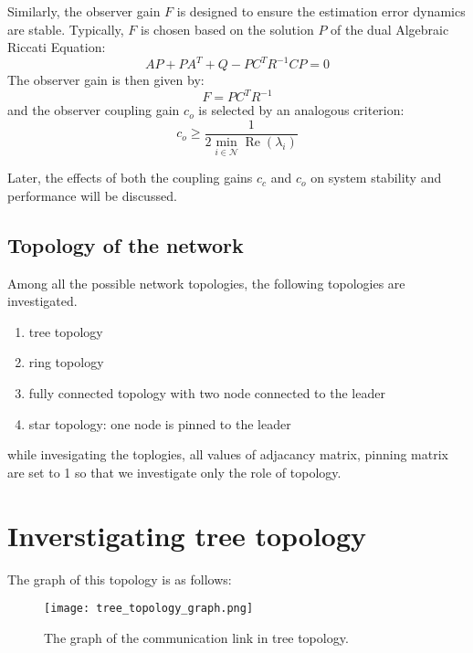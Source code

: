 Similarly, the observer gain \( F \) is designed to ensure the estimation error dynamics are stable. Typically, \( F \) is chosen based on the solution \( P \) of the dual Algebraic Riccati Equation:
\begin{equation}
A P + P A^{T} + Q - P C^{T} R^{-1} C P = 0
\end{equation}
The observer gain is then given by:
\begin{equation}
F = P C^{T} R^{-1}
\end{equation}
and the observer coupling gain \( c_o \) is selected by an analogous criterion:
\begin{equation}
c_o \geq \frac{1}{2 \min\limits_{i \in \mathcal{N}} \operatorname{Re}(\lambda_i)}
\end{equation}

Later, the effects of both the coupling gains \( c_c \) and \( c_o \) on system stability and performance will be discussed.

\subsection{Topology of the network}
Among all the possible network topologies, the following topologies are investigated. 
\begin{enumerate}
	\item tree topology
	\item ring topology
	\item fully connected topology with two node connected to the leader
	\item star topology: one node is pinned to the leader
\end{enumerate}

while invesigating the toplogies, all values of adjacancy matrix, pinning matrix are set to 1 so that we investigate only the role of topology.
\section{Inverstigating tree topology}
The graph of this topology is as follows:
\begin{figure}[H] %
    \centering
    \texttt{[image: tree\_topology\_graph.png]} %
    \caption{The graph of the communication link in tree topology.}
\end{figure}


